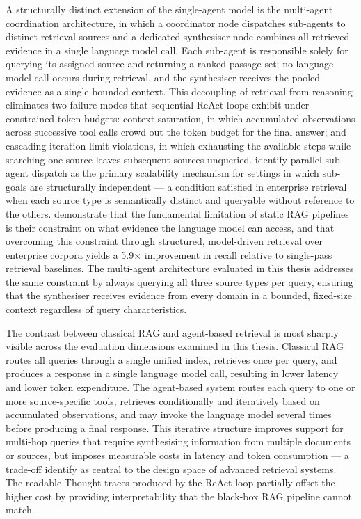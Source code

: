 A structurally distinct extension of the single-agent model is the multi-agent coordination architecture, in which a coordinator node dispatches sub-agents to distinct retrieval sources and a dedicated synthesiser node combines all retrieved evidence in a single language model call. Each sub-agent is responsible solely for querying its assigned source and returning a ranked passage set; no language model call occurs during retrieval, and the synthesiser receives the pooled evidence as a single bounded context. This decoupling of retrieval from reasoning eliminates two failure modes that sequential ReAct loops exhibit under constrained token budgets: context saturation, in which accumulated observations across successive tool calls crowd out the token budget for the final answer; and cascading iteration limit violations, in which exhausting the available steps while searching one source leaves subsequent sources unqueried.  identify parallel sub-agent dispatch as the primary scalability mechanism for settings in which sub-goals are structurally independent — a condition satisfied in enterprise retrieval when each source type is semantically distinct and queryable without reference to the others.  demonstrate that the fundamental limitation of static RAG pipelines is their constraint on what evidence the language model can access, and that overcoming this constraint through structured, model-driven retrieval over enterprise corpora yields a 5.9$\times$ improvement in recall relative to single-pass retrieval baselines. The multi-agent architecture evaluated in this thesis addresses the same constraint by always querying all three source types per query, ensuring that the synthesiser receives evidence from every domain in a bounded, fixed-size context regardless of query characteristics.

The contrast between classical RAG and agent-based retrieval is most sharply visible across the evaluation dimensions examined in this thesis. Classical RAG routes all queries through a single unified index, retrieves once per query, and produces a response in a single language model call, resulting in lower latency and lower token expenditure. The agent-based system routes each query to one or more source-specific tools, retrieves conditionally and iteratively based on accumulated observations, and may invoke the language model several times before producing a final response. This iterative structure improves support for multi-hop queries that require synthesising information from multiple documents or sources, but imposes measurable costs in latency and token consumption — a trade-off  identify as central to the design space of advanced retrieval systems. The readable Thought traces produced by the ReAct loop partially offset the higher cost by providing interpretability that the black-box RAG pipeline cannot match.


